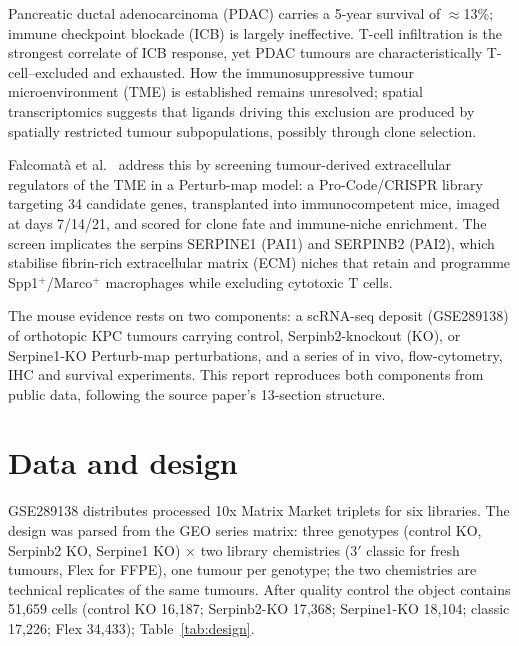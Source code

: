 \documentclass[preprint,12pt]{elsarticle}
\begin{document}
Pancreatic ductal adenocarcinoma (PDAC) carries a 5-year survival of
$\approx$13\%; immune checkpoint blockade (ICB) is largely ineffective.
T-cell infiltration is the strongest correlate of ICB response, yet
PDAC tumours are characteristically T-cell--excluded and exhausted.
How the immunosuppressive tumour microenvironment (TME) is established
remains unresolved; spatial transcriptomics suggests that ligands
driving this exclusion are produced by spatially restricted tumour
subpopulations, possibly through clone selection.

Falcomat\`a et al.\ \cite{falcomata2026} address this by screening
tumour-derived extracellular regulators of the TME in a Perturb-map
model: a Pro-Code/CRISPR library targeting 34 candidate genes,
transplanted into immunocompetent mice, imaged at days 7/14/21,
and scored for clone fate and immune-niche enrichment. The screen
implicates the serpins SERPINE1 (PAI1) and SERPINB2 (PAI2), which
stabilise fibrin-rich extracellular matrix (ECM) niches that retain
and programme Spp1$^{+}$/Marco$^{+}$ macrophages while excluding
cytotoxic T cells.

The mouse evidence rests on two components: a scRNA-seq deposit
(GSE289138) of orthotopic KPC tumours carrying control,
Serpinb2-knockout (KO), or Serpine1-KO Perturb-map perturbations,
and a series of in vivo, flow-cytometry, IHC and survival
experiments. This report reproduces both components from public
data, following the source paper's 13-section structure.


\section{Data and design}

GSE289138 distributes processed 10x Matrix Market triplets for six
libraries. The design was parsed from the GEO series matrix: three
genotypes (control KO, Serpinb2 KO, Serpine1 KO) $\times$ two library
chemistries (3$'$ classic for fresh tumours, Flex for FFPE), one
tumour per genotype; the two chemistries are technical replicates of
the same tumours. After quality control the object contains 51{,}659
cells (control KO 16{,}187; Serpinb2-KO 17{,}368; Serpine1-KO
18{,}104; classic 17{,}226; Flex 34{,}433);
Table~\ref{tab:design}.
\end{document}
